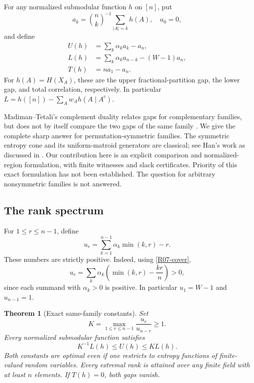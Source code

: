 \documentclass[11pt,a4paper]{article}
\newtheorem{theorem}{Theorem}[section]
\theoremstyle{definition}\newtheorem{definition}[theorem]{Definition}
\theoremstyle{remark}\newtheorem{remark}[theorem]{Remark}
\numberwithin{equation}{section}
\begin{document}
For any normalized submodular function $h$ on $[n]$, put
\[
a_k=\binom nk^{-1}\sum_{|A|=k}h(A),\quad a_0=0,
\]
and define
\begin{align}
 U(h)&=\sum_k\alpha_k a_k-a_n,\label{R07-upper}\\
 L(h)&=\sum_k\alpha_k a_{n-k}-(W-1)a_n,\label{R07-lower}\\
 T(h)&=na_1-a_n.
\end{align}
For $h(A)=H(X_A)$, these are the upper fractional-partition gap, the lower gap, and total correlation, respectively. In particular $L=h([n])-\sum_Aw_A h(A\mid A^c)$.

Madiman--Tetali's complement duality relates gaps for complementary families, but does not by itself compare the two gaps of the same family \cite{ref072}. We give the complete sharp answer for permutation-symmetric families. The symmetric entropy cone and its uniform-matroid generators are classical; see Han's work as discussed in \cite{ref073}. Our contribution here is an explicit comparison and normalized-region formulation, with finite witnesses and slack certificates. Priority of this exact formulation has not been established. The question for arbitrary nonsymmetric families is not answered.

\subsection{The rank spectrum}\label{R07-sec-2}
For $1\le r\le n-1$, define
\begin{equation}\label{R07-ur}
 u_r=\sum_{k=1}^{n-1}\alpha_k\min(k,r)-r.
\end{equation}
These numbers are strictly positive. Indeed, using \eqref{R07-cover},
\[
u_r=\sum_k\alpha_k\left(\min(k,r)-\frac{kr}{n}\right)>0,
\]
since each summand with $\alpha_k>0$ is positive. In particular $u_1=W-1$ and $u_{n-1}=1$.

\begin{theorem}[Exact same-family constants]\label{R07-main}
Set
\[
 K=\max_{1\le r\le n-1}\frac{u_r}{u_{n-r}}\ge1.
\]
Every normalized submodular function satisfies
\begin{equation}\label{R07-comp} K^{-1}L(h)\le U(h)\le K L(h).\end{equation}
Both constants are optimal even if one restricts to entropy functions of finite-valued random variables. Every extremal rank is attained over any finite field with at least $n$ elements. If $T(h)=0$, both gaps vanish.
\end{theorem}
\end{document}
